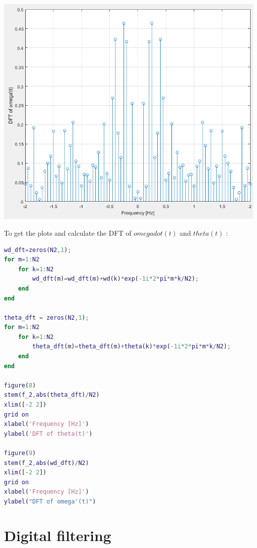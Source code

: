 \documentclass[a4paper,12pt]{article}
\begin{document}
\begin{enumerate}[label={\color{blue}\arabic*)}]
\begin{multicols}{2}
\begin{flushright}
            \includegraphics[width=1\linewidth]{Images/DFT_omega_dot.png}
            \label{Figure12}
        \end{flushright}

    \end{multicols}
    To get the plots and calculate the DFT of \(omega dot(t)\) and \(theta(t)\) :
    \begin{lstlisting}[style=Matlab-editor,language=Matlab, basicstyle=\small\ttfamily]
wd_dft=zeros(N2,1);
for m=1:N2
    for k=1:N2
        wd_dft(m)=wd_dft(m)+wd(k)*exp(-1i*2*pi*m*k/N2);
    end
end

theta_dft = zeros(N2,1);
for m=1:N2
    for k=1:N2
        theta_dft(m)=theta_dft(m)+theta(k)*exp(-1i*2*pi*m*k/N2);
    end
end

figure(8)
stem(f_2,abs(theta_dft)/N2)
xlim([-2 2])
grid on
xlabel('Frequency [Hz]')
ylabel('DFT of theta(t)')

figure(9)
stem(f_2,abs(wd_dft)/N2)
xlim([-2 2])
grid on
xlabel('Frequency [Hz]')
ylabel("DFT of omega'(t)")
        \end{lstlisting}

\end{enumerate}

\newpage
\section{Digital filtering}
\end{document}

